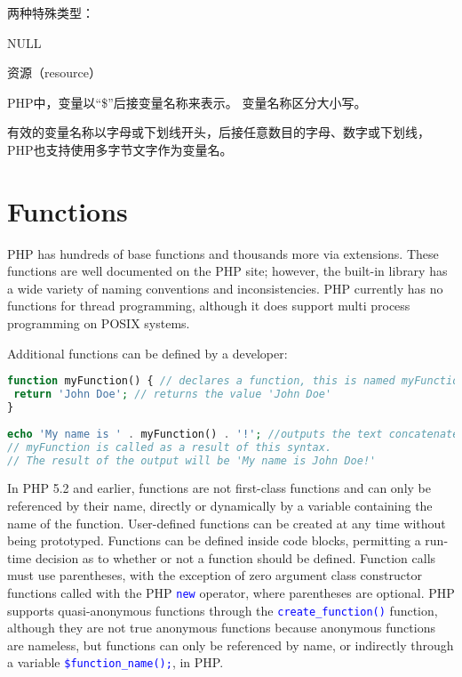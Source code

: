 两种特殊类型：


\begin{compactitem}
\item NULL
\item 资源（resource）
\end{compactitem}


PHP中，变量以“\$”后接变量名称来表示。 变量名称区分大小写。

有效的变量名称以字母或下划线开头，后接任意数目的字母、数字或下划线，PHP也支持使用多字节文字作为变量名。




\section{Functions}

PHP has hundreds of base functions and thousands more via extensions. These functions are well documented on the PHP site; however, the built-in library has a wide variety of naming conventions and inconsistencies. PHP currently has no functions for thread programming, although it does support multi process programming on POSIX systems.

Additional functions can be defined by a developer:


\begin{lstlisting}[language=PHP]
function myFunction() { // declares a function, this is named myFunction
 return 'John Doe'; // returns the value 'John Doe'
}
 
echo 'My name is ' . myFunction() . '!'; //outputs the text concatenated with the return value of myFunction.
// myFunction is called as a result of this syntax.
// The result of the output will be 'My name is John Doe!'
\end{lstlisting}

In PHP 5.2 and earlier, functions are not first-class functions and can only be referenced by their name, directly or dynamically by a variable containing the name of the function. User-defined functions can be created at any time without being prototyped. Functions can be defined inside code blocks, permitting a run-time decision as to whether or not a function should be defined. Function calls must use parentheses, with the exception of zero argument class constructor functions called with the PHP \textcolor{Blue}{\texttt{new}} operator, where parentheses are optional. PHP supports quasi-anonymous functions through the \textcolor{Blue}{\texttt{create\_function()}} function, although they are not true anonymous functions because anonymous functions are nameless, but functions can only be referenced by name, or indirectly through a variable \textcolor{Blue}{\texttt{\$function\_name();}}, in PHP.

